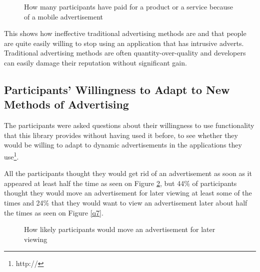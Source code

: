 \begin{figure}
\begin{center}
\caption{How many participants have paid for a product or a service because of a mobile advertisement}
\label{q5}
\end{center}
\end{figure}

This shows how ineffective traditional advertising methods are and that people are quite easily willing to stop using an application that has intrusive adverts. Traditional advertising methods are often quantity-over-quality and developers can easily damage their reputation without significant gain.

\subsection{Participants' Willingness to Adapt to New Methods of Advertising}

The participants were asked questions about their willingness to use functionality that this library provides without having used it before, to see whether they would be willing to adapt to dynamic advertisements in the applications they use\footnote{http://}.

All the participants thought they would get rid of an advertisement as soon as it appeared at least half the time as seen on Figure \ref{q6}, but 44\% of participants thought they would move an advertisement for later viewing at least some of the times and 24\% that they would want to view an advertisement later about half the times as seen on Figure \ref{q7}.

\begin{figure}
\begin{center}
\caption{How likely participants would move an advertisement for later viewing}
\label{q6}
\end{center}
\end{figure}

